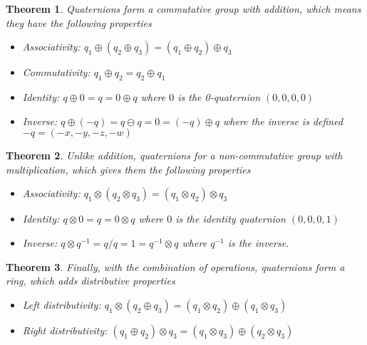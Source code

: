 \documentclass{amsart}
\newtheorem{theorem}{Theorem}[section]
\theoremstyle{definition}
\theoremstyle{remark}
\numberwithin{equation}{section}
\begin{document}
\begin{theorem}
  Quaternions form a commutative group with addition, which means they have the following properties
  \begin{itemize}
  \item Associativity: $q_1\oplus(q_2\oplus q_3) = (q_1\oplus q_2) \oplus q_3$
  \item Commutativity: $q_1\oplus q_2 = q_2 \oplus q_1$
  \item Identity: $q\oplus 0=q=0\oplus q$ where $0$ is the 0-quaternion $(0, 0, 0, 0)$
  \item Inverse: $q\oplus (-q)=q\ominus q=0=(-q)\oplus q$ where the inverse is defined $-q=(-x, -y, -z, -w)$
  \end{itemize}
\end{theorem}

\begin{theorem}
  Unlike addition, quaternions for a \emph{non-commutative} group with multiplication, which gives them the following properties
  \begin{itemize}
  \item Associativity: $q_1\otimes(q_2\otimes q_3) = (q_1\otimes q_2) \otimes q_3$
  \item Identity: $q\otimes0=q=0\otimes q$ where $0$ is the identity quaternion $(0, 0, 0, 1)$
  \item Inverse: $q\otimes q^{-1}=q/q=1=q^{-1}\otimes q$ where $q^{-1}$ is the inverse.
  \end{itemize}
\end{theorem}

\begin{theorem}
  Finally, with the combination of operations, quaternions form a ring, which adds distributive properties
  \begin{itemize}
  \item Left distributivity: $q_1 \otimes \left(q_2\oplus q_3\right) = \left(q_1\otimes q_2\right) \oplus \left(q_1\otimes q_3\right)$
    \item Right distributivity: $\left(q_1 \oplus q_2\right) \otimes q_3 = \left(q_1\otimes q_3\right) \oplus \left(q_2 \otimes q_3\right)$
  \end{itemize}
\end{theorem}
\end{document}
